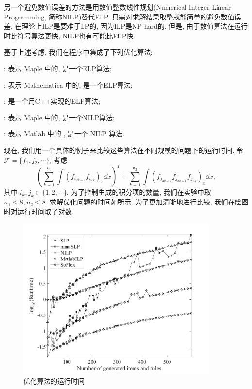 另一个避免数值误差的方法是用数值整数线性规划(Numerical Integer Linear Programming, 简称NILP)替代ELP. 只需对求解结果取整就能简单的避免数值误差. 在理论上ILP是要难于LP的, 因为ILP是NP-hard的. 但是, 由于数值算法在运行时比符号算法更快, NILP也有可能比ELP快. 

基于上述考虑, 我们在程序中集成了下列优化算法: 
\begin{compactitem}[\textbullet]
\item {}: 表示 Maple 中的, 是一个ELP算法; 
\item {}: 表示 Mathematica 中的, 是一个ELP算法;
\item {}\citep{soplex}: 是一个用C++实现的ELP算法;
\item {}: 表示 Maple 中的, 是一个NILP算法;
\item {}: 表示 Matlab 中的  , 是一个 NILP 算法.
\end{compactitem}

现在, 我们用一个具体的例子来比较这些算法在不同规模的问题下的运行时间. 令$\mathcal F=\{f_1,f_2,\cdots\}$, 考虑
\begin{equation}
\left(\sum\limits_{k=1}^{n_1}{\int\!{(f_{i_{2k-1}}f_{i_{2k}})_x\dd x}}\right)^2+\sum\limits_{k=1}^{n_2}{\int\!{(f_{j_{3k-2}}f_{j_{3k-1}}f_{j_{3k}})_x\dd x}},
\end{equation}
其中 $i_k,j_k \in \{1,2,\cdots\}$. 为了控制生成的积分项的数量, 我们在实验中取$n_1\le 8,n_2\le 8$. 求解优化问题的时间如所示. 为了更加清晰地进行比较, 我们在绘图时对运行时间取了对数. 

\begin{figure}[htb]
\centering
\includegraphics[width=0.9\textwidth]{fig/int-6.pdf}
\caption{优化算法的运行时间}\label{opts_log}
\label{opts_all}
\end{figure}

